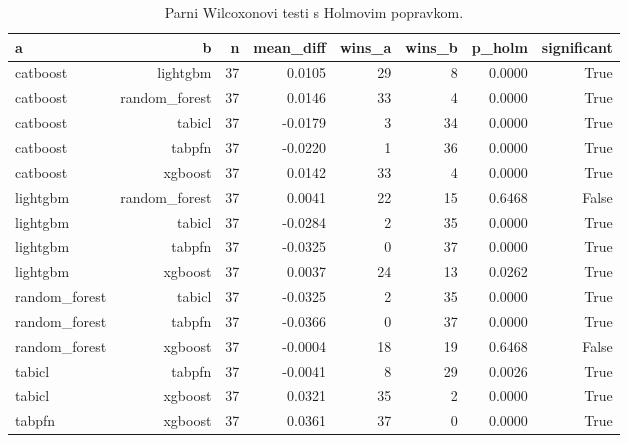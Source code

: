 \begin{table}[htbp]
\centering
\caption{Parni Wilcoxonovi testi s Holmovim popravkom.}
\label{tab:wilcoxon-nonsaturated}
\begin{tabular}{lrrrrrrr}
\hline
a & b & n & mean\_diff & wins\_a & wins\_b & p\_holm & significant \\
\hline
catboost & lightgbm & 37 & 0.0105 & 29 & 8 & 0.0000 & True \\
catboost & random\_forest & 37 & 0.0146 & 33 & 4 & 0.0000 & True \\
catboost & tabicl & 37 & -0.0179 & 3 & 34 & 0.0000 & True \\
catboost & tabpfn & 37 & -0.0220 & 1 & 36 & 0.0000 & True \\
catboost & xgboost & 37 & 0.0142 & 33 & 4 & 0.0000 & True \\
lightgbm & random\_forest & 37 & 0.0041 & 22 & 15 & 0.6468 & False \\
lightgbm & tabicl & 37 & -0.0284 & 2 & 35 & 0.0000 & True \\
lightgbm & tabpfn & 37 & -0.0325 & 0 & 37 & 0.0000 & True \\
lightgbm & xgboost & 37 & 0.0037 & 24 & 13 & 0.0262 & True \\
random\_forest & tabicl & 37 & -0.0325 & 2 & 35 & 0.0000 & True \\
random\_forest & tabpfn & 37 & -0.0366 & 0 & 37 & 0.0000 & True \\
random\_forest & xgboost & 37 & -0.0004 & 18 & 19 & 0.6468 & False \\
tabicl & tabpfn & 37 & -0.0041 & 8 & 29 & 0.0026 & True \\
tabicl & xgboost & 37 & 0.0321 & 35 & 2 & 0.0000 & True \\
tabpfn & xgboost & 37 & 0.0361 & 37 & 0 & 0.0000 & True \\
\hline
\end{tabular}
\end{table}
